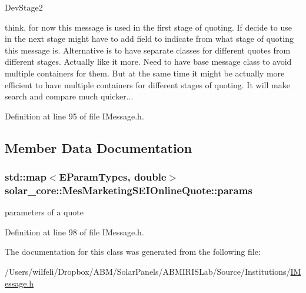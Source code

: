\begin{DoxyRefDesc}{Dev\+Stage2}
\item[\hyperlink{_dev_stage2__DevStage2000024}{Dev\+Stage2}]think, for now this message is used in the first stage of quoting. If decide to use in the next stage might have to add field to indicate from what stage of quoting this message is. Alternative is to have separate classes for different quotes from different stages. Actually like it more. Need to have base message class to avoid multiple containers for them. But at the same time it might be actually more efficient to have multiple containers for different stages of quoting. It will make search and compare much quicker...\end{DoxyRefDesc}


Definition at line 95 of file I\+Message.\+h.



\subsection{Member Data Documentation}
\hypertarget{classsolar__core_1_1_mes_marketing_s_e_i_online_quote_a985cbf3eb866c4488f0de003c4090aaf}{}
\subsubsection[{params}]{\setlength{\rightskip}{0pt plus 5cm}std\+::map$<${\bf E\+Param\+Types}, double$>$ solar\+\_\+core\+::\+Mes\+Marketing\+S\+E\+I\+Online\+Quote\+::params}\label{classsolar__core_1_1_mes_marketing_s_e_i_online_quote_a985cbf3eb866c4488f0de003c4090aaf}
parameters of a quote 

Definition at line 98 of file I\+Message.\+h.



The documentation for this class was generated from the following file\+:\begin{DoxyCompactItemize}
\item 
/\+Users/wilfeli/\+Dropbox/\+A\+B\+M/\+Solar\+Panels/\+A\+B\+M\+I\+R\+I\+S\+Lab/\+Source/\+Institutions/\hyperlink{_i_message_8h}{I\+Message.\+h}\end{DoxyCompactItemize}
